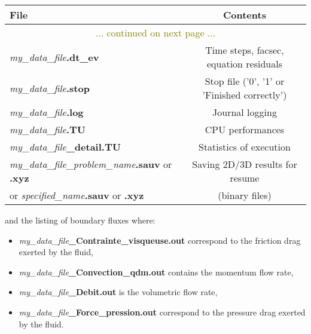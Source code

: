 \begin{longtable}{|l|c|}
\hline \textbf{File}                                    & \textbf{Contents} \\ \hline \hline \endhead
\hline\multicolumn{2}{|c|}{\textcolor{olive}{... continued on next page ...}}  \\ \hline \endfoot
\hline \endlastfoot
\textit{my\_data\_file}\textbf{.dt\_ev}                        & Time steps, facsec, equation residuals \\ \hline
\textit{my\_data\_file}\textbf{.stop}                          & Stop file ('0', '1' or 'Finished correctly') \\ \hline
\textit{my\_data\_file}\textbf{.log}                           & Journal logging  \\ \hline
\textit{my\_data\_file}\textbf{.TU}                            & CPU performances \\ \hline
\textit{my\_data\_file}\textbf{\_detail.TU}                    & Statistics of execution \\ \hline
\textit{my\_data\_file\_problem\_name}\textbf{.sauv} or \textbf{.xyz}      & Saving 2D/3D results for resume \\
or \textit{specified\_name}\textbf{.sauv} or \textbf{.xyz}                 & (binary files) \\ \hline
\end{longtable}

and the listing of boundary fluxes where:
\begin{itemize}
\item \textit{my\_data\_file}\textbf{\_Contrainte\_visqueuse.out} correspond to the friction drag exerted by the fluid,%
\item \textit{my\_data\_file}\textbf{\_Convection\_qdm.out} contains the momentum flow rate,
\item \textit{my\_data\_file}\textbf{\_Debit.out} is the volumetric flow rate,%
\item \textit{my\_data\_file}\textbf{\_Force\_pression.out} correspond to the pressure drag exerted by the fluid.%
\end{itemize}

